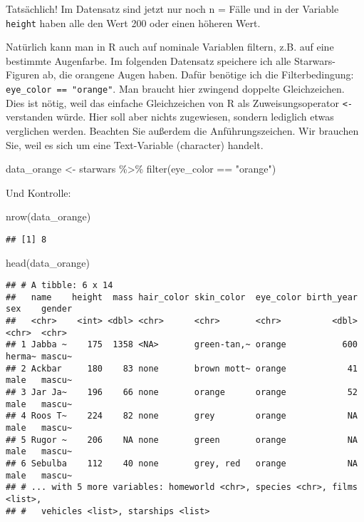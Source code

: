 \documentclass[
]{book}
\newenvironment{Shaded}{\begin{snugshade}}{\end{snugshade}}
\newcommand{\FunctionTok}[1]{\textcolor[rgb]{0.00,0.00,0.00}{#1}}
\newcommand{\NormalTok}[1]{#1}
\newcommand{\OtherTok}[1]{\textcolor[rgb]{0.56,0.35,0.01}{#1}}
\newcommand{\SpecialCharTok}[1]{\textcolor[rgb]{0.00,0.00,0.00}{#1}}
\newcommand{\StringTok}[1]{\textcolor[rgb]{0.31,0.60,0.02}{#1}}
\begin{document}
Tatsächlich! Im Datensatz sind jetzt nur noch n =  Fälle und in der Variable \texttt{height} haben alle den Wert 200 oder einen höheren Wert.

Natürlich kann man in R auch auf nominale Variablen filtern, z.B. auf eine bestimmte Augenfarbe. Im folgenden Datensatz speichere ich alle Starwars-Figuren ab, die orangene Augen haben. Dafür benötige ich die Filterbedingung: \texttt{eye\_color\ ==\ "orange"}. Man braucht hier zwingend doppelte Gleichzeichen. Dies ist nötig, weil das einfache Gleichzeichen von R als Zuweisungsoperator \texttt{\textless{}-} verstanden würde. Hier soll aber nichts zugewiesen, sondern lediglich etwas verglichen werden. Beachten Sie außerdem die Anführungszeichen. Wir brauchen Sie, weil es sich um eine Text-Variable (character) handelt.

\begin{Shaded}
\begin{Highlighting}[]
\NormalTok{data\_orange }\OtherTok{\textless{}{-}}\NormalTok{ starwars }\SpecialCharTok{\%\textgreater{}\%} 
  \FunctionTok{filter}\NormalTok{(eye\_color }\SpecialCharTok{==} \StringTok{"orange"}\NormalTok{)}
\end{Highlighting}
\end{Shaded}

Und Kontrolle:

\begin{Shaded}
\begin{Highlighting}[]
\FunctionTok{nrow}\NormalTok{(data\_orange)}
\end{Highlighting}
\end{Shaded}

\begin{verbatim}
## [1] 8
\end{verbatim}

\begin{Shaded}
\begin{Highlighting}[]
\FunctionTok{head}\NormalTok{(data\_orange)}
\end{Highlighting}
\end{Shaded}

\begin{verbatim}
## # A tibble: 6 x 14
##   name    height  mass hair_color skin_color  eye_color birth_year sex    gender
##   <chr>    <int> <dbl> <chr>      <chr>       <chr>          <dbl> <chr>  <chr> 
## 1 Jabba ~    175  1358 <NA>       green-tan,~ orange           600 herma~ mascu~
## 2 Ackbar     180    83 none       brown mott~ orange            41 male   mascu~
## 3 Jar Ja~    196    66 none       orange      orange            52 male   mascu~
## 4 Roos T~    224    82 none       grey        orange            NA male   mascu~
## 5 Rugor ~    206    NA none       green       orange            NA male   mascu~
## 6 Sebulba    112    40 none       grey, red   orange            NA male   mascu~
## # ... with 5 more variables: homeworld <chr>, species <chr>, films <list>,
## #   vehicles <list>, starships <list>
\end{verbatim}
\end{document}
